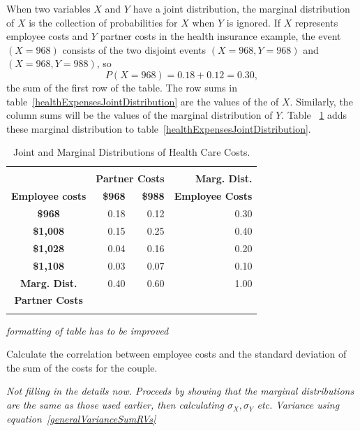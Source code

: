 When two variables $X$ and $Y$ have a joint distribution, the marginal distribution of $X$ is the collection of probabilities for $X$ when $Y$ is ignored.  If $X$ represents employee costs and $Y$ partner costs in the health insurance example, the event $(X = 968)$ consists of the two  disjoint events $(X = 968, Y = 968)$ and $(X = 968, Y = 988)$, so 
\[
    P(X = 968) = 0.18 + 0.12 = 0.30,
\]
the sum of the first row of the table. The row sums in table~\ref{healthExpensesJointDistribution} are the values of the  of $X$.  Similarly, the column sums will be the values of the marginal distribution of $Y$.  Table ~\ref{healthExpensesJointMarginalDistribution} adds these marginal distribution to table~\ref{healthExpensesJointDistribution}.
\newpage

\begin{table}[h]
\centering
\begin{tabular}{crrr}
  \hline \\
  &   \multicolumn{2}{c}{\textbf{Partner Costs}} & \textbf{Marg. Dist.}\\
\textbf{Employee costs} & \textbf{\$968} & \textbf{\$988} & \textbf{Employee Costs} \\ 
  \hline
\textbf{\$968} & 0.18 & 0.12 & 0.30\\ 
 \textbf{\$1,008} & 0.15 & 0.25 & 0.40 \\ 
 \textbf{\$1,028}  & 0.04 & 0.16 & 0.20\\ 
 \textbf{\$1,108}  & 0.03 & 0.07  & 0.10\\ 
   \hline
 \textbf{Marg. Dist.} & 0.40 & 0.60 & 1.00 \\
 \textbf{Partner Costs} &  &  & \\
 \hline \\
\end{tabular}
\caption{Joint and Marginal Distributions of Health Care Costs.} 
\label{healthExpensesJointMarginalDistribution}
\end{table}

\textit{formatting of table has to be  improved}


\begin{example}Calculate the correlation between employee costs and the standard deviation of the sum of the costs for the couple.
	
	\textit{Not filling in the details now. Proceeds by showing that the marginal distributions are the same as those used earlier, then calculating $\sigma_X, \sigma_Y$ etc.  Variance using equation~\ref{generalVarianceSumRVs}}
	\end{example}

